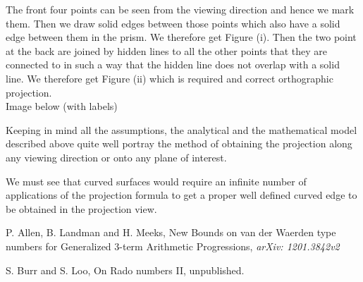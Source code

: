 \documentclass[12pt]{report}
\begin{document}
The front four points can be seen from the viewing direction and hence we mark them. Then we draw solid edges between those points which also have a solid edge between them in the prism. We therefore get	Figure (i). Then the two point at the back are joined by hidden lines to all the other points that they are connected to in such a way that the hidden line does not overlap with a solid line. We therefore get Figure (ii) which is required and correct orthographic projection.
\\
Image below (with labels) \\
\vspace{4cm}

Keeping in mind all the assumptions, the analytical and the mathematical model described above quite well portray the method of obtaining the projection along any viewing direction or onto any plane of interest.
\\
\vspace{0.3cm}

We must see that curved surfaces would require an infinite number of applications of the projection formula to get a proper well defined curved edge to be obtained in the projection view.



%

\begin{thebibliography}{9}


P. Allen, B. Landman and H. Meeks, New Bounds on van der Waerden type numbers for Generalized $3$-term Arithmetic Progressions, {\it arXiv: 1201.3842v2}


S. Burr and S. Loo, On Rado numbers II, unpublished.

\end{thebibliography}
\end{document}
